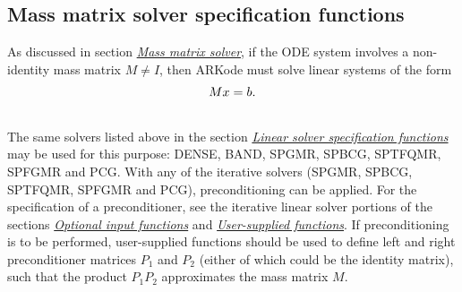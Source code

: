 \documentclass[letterpaper,10pt,english]{sphinxmanual}
\begin{document}
\subsection{Mass matrix solver specification functions}
\label{c_interface/User_callable:cinterface-massmatrixsolvers}\label{c_interface/User_callable:mass-matrix-solver-specification-functions}
As discussed in section {\hyperref[Mathematics:mathematics-masssolve]{\emph{Mass matrix solver}}}, if the ODE
system involves a non-identity mass matrix $M\ne I$, then ARKode
must solve linear systems of the form
\begin{gather}
\begin{split}M x = b.\end{split}\notag\\\begin{split}\end{split}\notag
\end{gather}
The same solvers listed above in the section
{\hyperref[c_interface/User_callable:cinterface-linearsolvers]{\emph{Linear solver specification functions}}} may be used for this purpose:
DENSE, BAND, SPGMR, SPBCG, SPTFQMR, SPFGMR and PCG.
With any of the iterative solvers (SPGMR, SPBCG, SPTFQMR, SPFGMR and PCG),
preconditioning can be applied.  For the specification of a
preconditioner, see the iterative linear solver portions of the sections
{\hyperref[c_interface/User_callable:cinterface-optionalinputs]{\emph{Optional input functions}}} and {\hyperref[c_interface/User_supplied:cinterface-usersupplied]{\emph{User-supplied functions}}}.
If preconditioning is to be performed, user-supplied functions should
be used to define left and right preconditioner matrices $P_1$ and
$P_2$ (either of which could be the identity matrix), such that
the product $P_{1}P_{2}$ approximates the mass matrix $M$.
\end{document}
